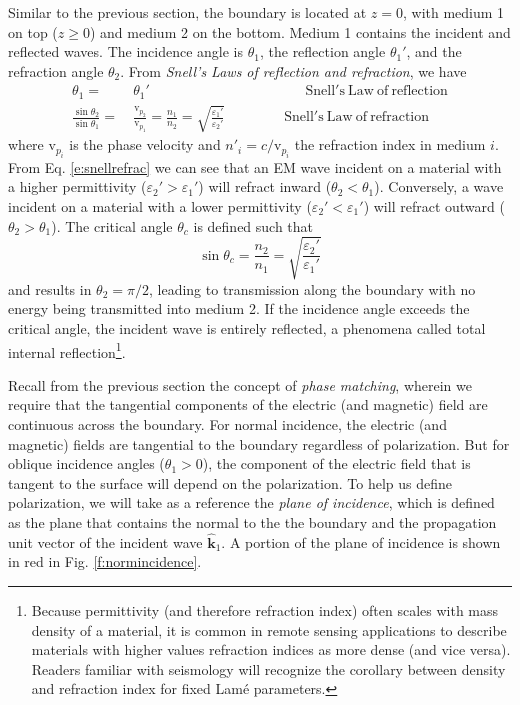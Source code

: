 \documentclass[11pt, oneside]{article}
\begin{document}
Similar to the previous section, the boundary is located at $z=0$, with medium 1 on top ($z\ge0$) and medium 2 on the bottom. Medium 1 contains the incident and reflected waves. The incidence angle is $\theta_1$, the reflection angle $\theta_1'$, and the refraction angle $\theta_2$. From \emph{Snell's Laws of reflection and refraction}, we have
	\begin{subequations}
	\label{e:snells}
	\begin{align}
	\theta_1 =&\ \theta_1'   \qquad\qquad\qquad\qquad \qquad\;\;\;\; \mathrm{Snell's\ Law\ of\ reflection}  \label{e:snellreflec}\\
	\frac{\sin{\theta_2}}{\sin{\theta_1}} = &\ \frac{\mathrm{v}_{p_2}}{\mathrm{v}_{p_1}} = \frac{n_1}{n_2} = \sqrt{\frac{\varepsilon_1'}{\varepsilon_2'}} 
				\qquad\qquad\ \mathrm{Snell's\ Law\ of\ refraction} \label{e:snellrefrac}
	\end{align}
	\end{subequations}
where $\mathrm{v}_{p_i}$ is the phase velocity and $n'_i = c/\mathrm{v}_{p_i}$ the refraction index in medium $i$. From Eq. \ref{e:snellrefrac} we can see that an EM wave incident on a material with a higher permittivity ($\varepsilon_2' > \varepsilon_1'$) will refract inward ($\theta_2 < \theta_1$). Conversely, a wave incident on a material with a lower permittivity ($\varepsilon_2' < \varepsilon_1'$) will refract outward ($\theta_2 > \theta_1$). The critical angle $\theta_c$ is defined such that
	\begin{equation}
	\sin{\theta_c} = \frac{n_2}{n_1} = \sqrt{\frac{\varepsilon_2'}{\varepsilon_1'}}
	\end{equation}
and results in $\theta_2 = \pi/2$, leading to transmission along the boundary with no energy being transmitted into medium 2. If the incidence angle exceeds the critical angle, the incident wave is entirely reflected, a phenomena called total internal reflection\footnote{Because permittivity (and therefore refraction index) often scales with mass density of a material, it is common in remote sensing applications to describe materials with higher values refraction indices as more dense (and vice versa). Readers familiar with seismology will recognize the corollary between density and refraction index for fixed Lam\'e parameters.}.

Recall from the previous section the concept of \emph{phase matching}, wherein we require that the tangential components of the electric (and magnetic) field are continuous across the boundary. For normal incidence, the electric (and magnetic) fields are tangential to the boundary regardless of polarization. But for oblique incidence angles ($\theta_1 > 0$), the component of the electric field that is tangent to the surface will depend on the polarization. To help us define polarization, we will take as a reference the \emph{plane of incidence}, which is defined as the plane that contains the normal to the the boundary and the propagation unit vector of the incident wave $\hat{\mathbf{k}}_1$. A portion of the plane of incidence is shown in red in Fig. \ref{f:normincidence}. 
\end{document}
